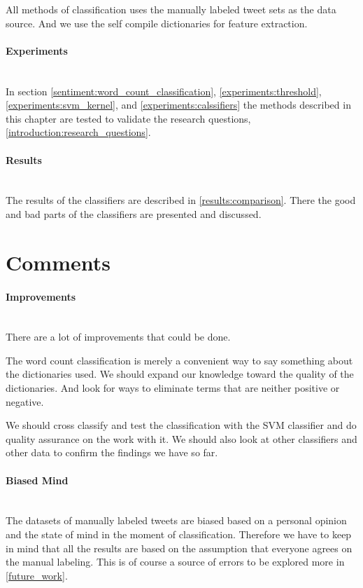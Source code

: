 All methods of classification uses the manually labeled tweet sets as the data
source. And we use the self compile dictionaries for feature extraction. 

\paragraph{Experiments}
\hspace{0pt}\\
In section \ref{sentiment:word_count_classification},
\ref{experiments:threshold}, \ref{experiments:svm_kernel}, and
\ref{experiments:calssifiers} the methods described in this chapter are tested
to validate the research questions, \ref{introduction:research_questions}.

\paragraph{Results}
\hspace{0pt}\\
The results of the classifiers are described in \ref{results:comparison}. There
the good and bad parts of the classifiers are presented and discussed. 
%

\section{Comments}\label{sentiment:comments_discussion}
\paragraph{Improvements}
\hspace{0pt}\\
There are a lot of improvements that could be done. 

The word count classification is merely a convenient way to say something about
the dictionaries used. We should expand our knowledge toward the quality of the
dictionaries. And look for ways to eliminate terms that are neither positive or
negative. 

We should cross classify and test the classification with the SVM classifier and
do quality assurance on the work with it. We should also look at other
classifiers and other data to confirm the findings we have so far. 

\paragraph{Biased Mind}
\hspace{0pt}\\
The datasets of manually labeled tweets are biased based on a personal opinion
and the state of mind in the moment of classification. Therefore we have to keep
in mind that all the results are based on the assumption that everyone agrees on
the manual labeling. This is of course a source of errors to be
explored more in \ref{future_work}. 


